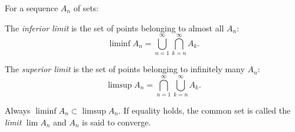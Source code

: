 For a sequence $A_n$ of sets:

The \textit{inferior limit} is the set of points belonging to almost all $A_n$:
$$\liminf A_n = \bigcup_{n=1}^{\infty} \bigcap_{k=n}^{\infty} A_k.$$

The \textit{superior limit} is the set of points belonging to infinitely many $A_n$:
$$\limsup A_n = \bigcap_{n=1}^{\infty} \bigcup_{k=n}^{\infty} A_k.$$

Always $\liminf A_n \subset \limsup A_n$. If equality holds, the common set is called the \textit{limit} $\lim A_n$ and $A_n$ is said to converge.
